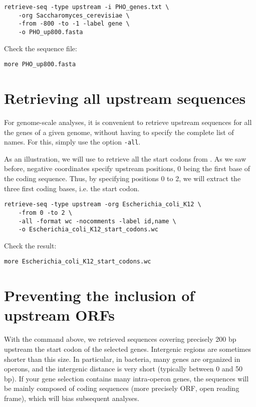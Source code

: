 \begin{verbatim}
retrieve-seq -type upstream -i PHO_genes.txt \
    -org Saccharomyces_cerevisiae \
    -from -800 -to -1 -label gene \
    -o PHO_up800.fasta
\end{verbatim} 

Check the sequence file:

\begin{verbatim}
more PHO_up800.fasta
\end{verbatim}

\section{Retrieving all upstream sequences}

For genome-scale analyses, it is convenient to retrieve upstream
sequences for all the genes of a given genome, without having to
specify the complete list of names. For this, simply use the option
\texttt{-all}.

As an illustration, we will use \command{retrieve-seq} to retrieve all
the start codons from . As we saw before,
negative coordinates specify upstream positions, 0 being the first
base of the coding sequence. Thus, by specifying positions 0 to 2, we
will extract the three first coding bases, i.e. the start codon. 

\begin{verbatim}
retrieve-seq -type upstream -org Escherichia_coli_K12 \
    -from 0 -to 2 \
    -all -format wc -nocomments -label id,name \
    -o Escherichia_coli_K12_start_codons.wc
\end{verbatim}

Check the result:

\begin{verbatim}
more Escherichia_coli_K12_start_codons.wc
\end{verbatim}

\section{Preventing the inclusion of upstream ORFs}

With the command above, we retrieved sequences covering precisely 200
bp upstream the start codon of the selected genes. Intergenic regions
are sometimes shorter than this size. In particular, in bacteria, many
genes are organized in operons, and the intergenic distance is very
short (typically between 0 and 50 bp). If your gene selection contains
many intra-operon genes, the sequences will be mainly composed of
coding sequences (more precisely ORF, open reading frame), which will
bias subsequent analyses.

